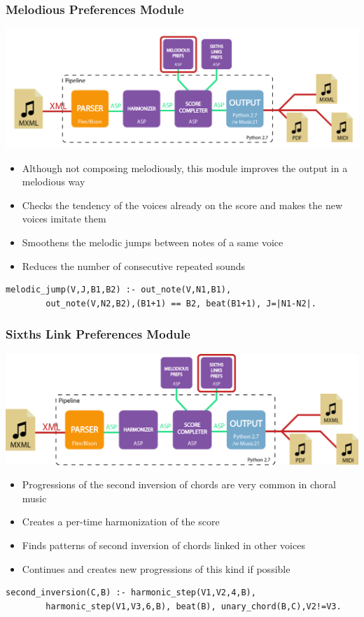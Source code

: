 \documentclass[english]{beamer}
\begin{document}
	\begin{frame}[t,fragile]
	\frametitle{Melodious Preferences Module}
	\begin{center}
			\includegraphics[width=0.6\linewidth]{imagenes/arch_trans/arquitectura_final_asp_pref_mel-01.png}
			\end{center}
	\begin{itemize}
		\item Although not composing melodiously, this module \alert{improves the output in a melodious way}
		\pause
		\item \alert{Checks the tendency} of the voices already on the score and makes the new voices imitate them
		\pause
		\item \alert{Smoothens the melodic jumps} between notes of a same voice
		\item Reduces the number of \alert{consecutive repeated sounds}
	\end{itemize}
		\begin{Verbatim}[frame=single]
		melodic_jump(V,J,B1,B2) :- out_note(V,N1,B1),
		out_note(V,N2,B2),(B1+1) == B2, beat(B1+1), J=|N1-N2|.
		\end{Verbatim}
	\end{frame}
	\begin{frame}[t,fragile]
	\frametitle{Sixths Link Preferences Module}
	\begin{center}
			\includegraphics[width=0.6\linewidth]{imagenes/arch_trans/arquitectura_final_asp_pref_six.png}
			\end{center}
	\begin{itemize}
		\item Progressions of the \alert{second inversion of chords} are very common in choral music
		\item Creates a \alert{per-time harmonization} of the score
		\item \alert{Finds patterns} of second inversion of chords linked in other voices
		\item \alert{Continues and creates} new progressions of this kind if possible
	\end{itemize}
	\begin{Verbatim}[frame=single]
		second_inversion(C,B) :- harmonic_step(V1,V2,4,B), 
		harmonic_step(V1,V3,6,B), beat(B), unary_chord(B,C),V2!=V3.
	\end{Verbatim}
	\end{frame}
\end{document}
